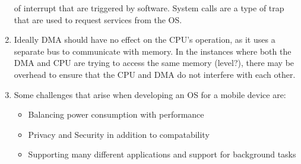 \documentclass{article}
\begin{document}
\begin{enumerate}
          of interrupt that are triggered by software. System calls are a type of trap
          that are used to request services from the OS.
    \item Ideally DMA should have no effect on the CPU's operation, as it uses a
          separate bus to communicate with memory. In the instances where both the DMA
          and CPU are trying to access the same memory (level?), there may be overhead to
          ensure that the CPU and DMA do not interfere with each other.
    \item Some challenges that arise when developing an OS for a mobile device are:
          \begin{itemize}
              \item Balancing power consumption with performance
              \item Privacy and Security in addition to compatability
              \item Supporting many different applications and support for
                    background tasks
          \end{itemize}
\end{enumerate}
\end{document}
